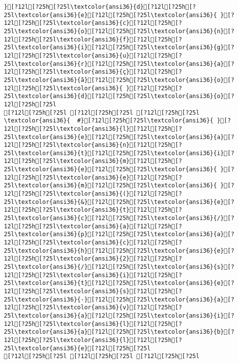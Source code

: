 \documentclass{scrartcl}
\begin{document}
\begin{Verbatim}
}[?12l[?25h[?25l\textcolor{ansi36}{d}[?12l[?25h[?25l\textcolor{ansi36}{e}[?12l[?25h[?25l\textcolor{ansi36}{ }[?12l[?25h[?25l\textcolor{ansi36}{c}[?12l[?25h[?25l\textcolor{ansi36}{o}[?12l[?25h[?25l\textcolor{ansi36}{n}[?12l[?25h[?25l\textcolor{ansi36}{f}[?12l[?25h[?25l\textcolor{ansi36}{i}[?12l[?25h[?25l\textcolor{ansi36}{g}[?12l[?25h[?25l\textcolor{ansi36}{u}[?12l[?25h[?25l\textcolor{ansi36}{r}[?12l[?25h[?25l\textcolor{ansi36}{a}[?12l[?25h[?25l\textcolor{ansi36}{ç}[?12l[?25h[?25l\textcolor{ansi36}{ã}[?12l[?25h[?25l\textcolor{ansi36}{o}[?12l[?25h[?25l\textcolor{ansi36}{ }[?12l[?25h[?25l\textcolor{ansi36}{d}[?12l[?25h[?25l\textcolor{ansi36}{o}[?12l[?25h[?25l
[?12l[?25h[?25l [?12l[?25h[?25l [?12l[?25h[?25l
\textcolor{ansi36}{  #}[?12l[?25h[?25l\textcolor{ansi36}{ }[?12l[?25h[?25l\textcolor{ansi36}{l}[?12l[?25h[?25l\textcolor{ansi36}{e}[?12l[?25h[?25l\textcolor{ansi36}{a}[?12l[?25h[?25l\textcolor{ansi36}{n}[?12l[?25h[?25l\textcolor{ansi36}{t}[?12l[?25h[?25l\textcolor{ansi36}{i}[?12l[?25h[?25l\textcolor{ansi36}{m}[?12l[?25h[?25l\textcolor{ansi36}{e}[?12l[?25h[?25l\textcolor{ansi36}{ }[?12l[?25h[?25l\textcolor{ansi36}{e}[?12l[?25h[?25l\textcolor{ansi36}{m}[?12l[?25h[?25l\textcolor{ansi36}{ }[?12l[?25h[?25l\textcolor{ansi36}{(}[?12l[?25h[?25l\textcolor{ansi36}{&}[?12l[?25h[?25l\textcolor{ansi36}{e}[?12l[?25h[?25l\textcolor{ansi36}{t}[?12l[?25h[?25l\textcolor{ansi36}{c}[?12l[?25h[?25l\textcolor{ansi36}{/}[?12l[?25h[?25l\textcolor{ansi36}{a}[?12l[?25h[?25l\textcolor{ansi36}{p}[?12l[?25h[?25l\textcolor{ansi36}{a}[?12l[?25h[?25l\textcolor{ansi36}{c}[?12l[?25h[?25l\textcolor{ansi36}{h}[?12l[?25h[?25l\textcolor{ansi36}{e}[?12l[?25h[?25l\textcolor{ansi36}{2}[?12l[?25h[?25l\textcolor{ansi36}{/}[?12l[?25h[?25l\textcolor{ansi36}{s}[?12l[?25h[?25l\textcolor{ansi36}{i}[?12l[?25h[?25l\textcolor{ansi36}{t}[?12l[?25h[?25l\textcolor{ansi36}{e}[?12l[?25h[?25l\textcolor{ansi36}{s}[?12l[?25h[?25l\textcolor{ansi36}{-}[?12l[?25h[?25l\textcolor{ansi36}{a}[?12l[?25h[?25l\textcolor{ansi36}{v}[?12l[?25h[?25l\textcolor{ansi36}{a}[?12l[?25h[?25l\textcolor{ansi36}{i}[?12l[?25h[?25l\textcolor{ansi36}{l}[?12l[?25h[?25l\textcolor{ansi36}{a}[?12l[?25h[?25l\textcolor{ansi36}{b}[?12l[?25h[?25l\textcolor{ansi36}{l}[?12l[?25h[?25l\textcolor{ansi36}{e}[?12l[?25h[?25l
[?12l[?25h[?25l [?12l[?25h[?25l [?12l[?25h[?25l

\end{Verbatim}
\end{document}
